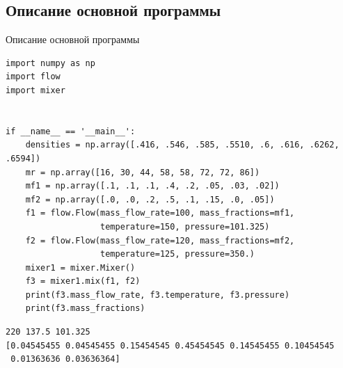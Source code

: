 \documentclass[aspectratio=169, mathserif]{beamer}	%
\begin{document}
\subsection{Описание основной программы}
\begin{frame}[fragile]{Описание основной программы}
\scriptsize
\begin{verbatim}
import numpy as np
import flow
import mixer


if __name__ == '__main__':
    densities = np.array([.416, .546, .585, .5510, .6, .616, .6262, .6594])
    mr = np.array([16, 30, 44, 58, 58, 72, 72, 86])
    mf1 = np.array([.1, .1, .1, .4, .2, .05, .03, .02])
    mf2 = np.array([.0, .0, .2, .5, .1, .15, .0, .05])
    f1 = flow.Flow(mass_flow_rate=100, mass_fractions=mf1,
                   temperature=150, pressure=101.325)
    f2 = flow.Flow(mass_flow_rate=120, mass_fractions=mf2,
                   temperature=125, pressure=350.)
    mixer1 = mixer.Mixer()
    f3 = mixer1.mix(f1, f2)
    print(f3.mass_flow_rate, f3.temperature, f3.pressure)
    print(f3.mass_fractions)
\end{verbatim}
\begin{verbatim}
220 137.5 101.325
[0.04545455 0.04545455 0.15454545 0.45454545 0.14545455 0.10454545
 0.01363636 0.03636364]
\end{verbatim}
\vfill
\end{frame}


\end{document}
